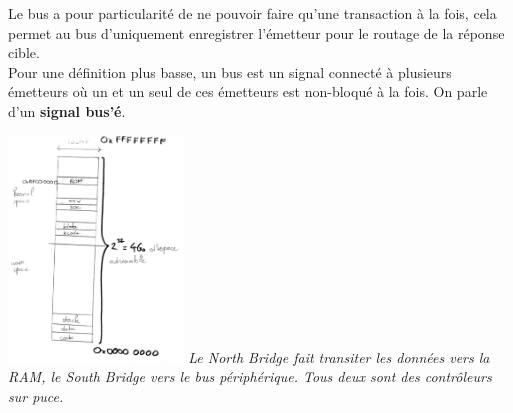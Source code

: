 Le bus a pour particularité de ne pouvoir faire qu'une transaction à la fois, cela
permet au bus d'uniquement enregistrer l'émetteur pour le routage de la réponse
cible.\\

Pour une définition plus basse, un bus est un signal connecté à plusieurs émetteurs où
un et un seul de ces émetteurs est non-bloqué à la fois. On parle d'un {\bf signal
bus'é}.
\begin{center}
  \includegraphics[height=6cm]{cours2/pics/mem.jpg}
  \newline{}
  {\it Le North Bridge fait transiter les données vers la RAM, le South Bridge
  vers le bus périphérique. Tous deux sont des contrôleurs sur puce.}
\end{center}
